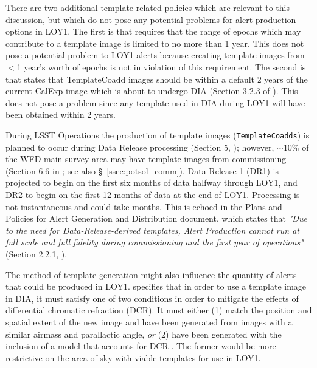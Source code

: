 \documentclass[DM,lsstdraft,toc]{lsstdoc}
\begin{document}

There are two additional template-related policies which are relevant to this discussion, but which do not pose any potential problems for alert production options in LOY1. The first is that  requires that the range of epochs which may contribute to a template image is limited to no more than 1 year. This does not pose a potential problem to LOY1 alerts because creating template images from $<$1 year's worth of epochs is not in violation of this requirement. The second is that  states that TemplateCoadd images should be within a default $2$ years of the current CalExp image which is about to undergo DIA (Section 3.2.3 of \cite{LDM-151}). This does not pose a problem since any template used in DIA during LOY1 will have been obtained within 2 years.

During LSST Operations the production of template images ({\tt TemplateCoadds}) is planned to occur during Data Release processing (Section 5, ); however, $\sim$10\% of the WFD main survey area may have template images from commissioning (Section 6.6 in ; see also \S~\ref{ssec:potsol_comm}). Data Release 1 (DR1) is projected to begin on the first six months of data halfway through LOY1, and DR2 to begin on the first 12 months of data at the end of LOY1. Processing is not instantaneous and could take months. This is echoed in the Plans and Policies for Alert Generation and Distribution document, which states that {\it "Due to the need for Data-Release-derived templates, Alert Production cannot run at full scale and full fidelity during commissioning and the first year of operations"} (Section 2.2.1, ). 

The method of template generation might also influence the quantity of alerts that could be produced in LOY1.  specifies that in order to use a template image in DIA, it must satisfy one of two conditions in order to mitigate the effects of differential chromatic refraction (DCR). It must either (1) match the position and spatial extent of the new image and have been generated from images with a similar airmass and parallactic angle, {\em or} (2) have been generated with the inclusion of a model that accounts for DCR . The former would be more restrictive on the area of sky with viable templates for use in LOY1.
\end{document}
